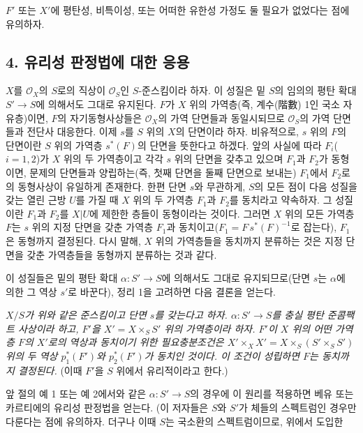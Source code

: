 \documentclass[11pt,twoside,openany]{book}
\numberwithin{equation}{section}
\theoremstyle{plain}
\theoremstyle{definition}
\theoremstyle{remark}
\begin{document}
$F'$ 또는 $X'$에 평탄성, 비특이성, 또는 어떠한 유한성 가정도 둘 필요가
없었다는 점에 유의하자.

\subsection*{4. 유리성 판정법에 대한 응용}

$X$를 $\mathcal O_X$의 $S$로의 직상이 $\mathcal O_S$인
$S$-준스킴이라 하자. 이 성질은 밑 $S$의 임의의 평탄 확대
$S'\longrightarrow S$에 의해서도 그대로 유지된다. $F$가 $X$ 위의
가역층(즉, 계수(階數) 1인 국소 자유층)이면, $F$의 자기동형사상들은
$\mathcal O_X$의 가역 단면들과 동일시되므로 $\mathcal O_S$의 가역
단면들과 전단사 대응한다. 이제 $s$를 $S$ 위의 $X$의 단면이라 하자.
비유적으로, $s$ 위의 $F$의 단면이란 $S$ 위의 가역층 $s^*(F)$의 단면을
뜻한다고 하겠다. 앞의 사실에 따라 $F_i$($i=1,2$)가 $X$ 위의 두
가역층이고 각각 $s$ 위의 단면을 갖추고 있으며 $F_1$과 $F_2$가
동형이면, 문제의 단면들과 양립하는(즉, 첫째 단면을 둘째 단면으로 보내는)
$F_1$에서 $F_2$로의 동형사상이 유일하게 존재한다. 한편 단면 $s$와
무관하게, $S$의 모든 점이 다음 성질을 갖는 열린 근방 $U$를 가질 때
$X$ 위의 두 가역층 $F_1$과 $F_2$를 동치라고 약속하자. 그 성질이란
$F_1$과 $F_2$를 $X|U$에 제한한 층들이 동형이라는 것이다. 그러면
$X$ 위의 모든 가역층 $F$는 $s$ 위의 지정 단면을 갖춘 가역층 $F_1$과
동치이고($F_1=F\,s^*(F)^{-1}$로 잡는다), $F_1$은 동형까지 결정된다.
다시 말해, $X$ 위의 가역층들을 동치까지 분류하는 것은 지정 단면을 갖춘
가역층들을 동형까지 분류하는 것과 같다.

이 성질들은 밑의 평탄 확대 $\alpha:S'\longrightarrow S$에 의해서도
그대로 유지되므로(단면 $s$는 $\alpha$에 의한 그 역상 $s'$로 바꾼다),
정리 1을 고려하면 다음 결론을 얻는다.

\emph{$X/S$가 위와 같은 준스킴이고 단면 $s$를 갖는다고 하자.
$\alpha:S'\longrightarrow S$를 충실 평탄 준콤팩트 사상이라 하고,
$F'$을 $X'=X\times_SS'$ 위의 가역층이라 하자. $F'$이 $X$ 위의 어떤
가역층 $F$의 $X'$로의 역상과 동치이기 위한 필요충분조건은
$X'\times_XX'=X\times_S(S'\times_SS')$ 위의 두 역상
$p_1^*(F')$와 $p_2^*(F')$가 동치인 것이다. 이 조건이 성립하면 $F$는
동치까지 결정된다.} (이때 $F'$을 $S$ 위에서 유리적이라고 한다.)

앞 절의 예 1 또는 예 2에서와 같은 $\alpha:S'\longrightarrow S$의
경우에 이 원리를 적용하면 베유 또는 카르티에의 유리성 판정법을 얻는다.
(이 저자들은 $S$와 $S'$가 체들의 스펙트럼인 경우만 다룬다는 점에
유의하자. 더구나 이때 $S$는 국소환의 스펙트럼이므로, 위에서 도입한
\end{document}

